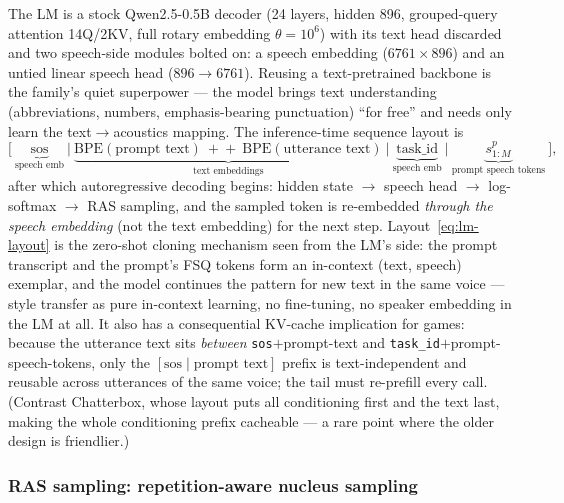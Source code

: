 \documentclass[11pt,a4paper]{article}
\newcommand{\code}[1]{\texttt{#1}}
\begin{document}
The LM is a stock Qwen2.5-0.5B decoder (24 layers, hidden 896, grouped-query attention
14Q/2KV, full rotary embedding $\theta = 10^6$) with its text head discarded and two
speech-side modules bolted on: a speech embedding ($6761 \times 896$) and an untied
linear speech head ($896 \to 6761$). Reusing a text-pretrained backbone is the family's
quiet superpower --- the model brings text understanding (abbreviations, numbers,
emphasis-bearing punctuation) ``for free'' and needs only learn the text$\to$acoustics
mapping. The inference-time sequence layout is
\begin{equation}
\big[\ \underbrace{\mathrm{sos}}_{\text{speech emb}} \ \big|\
\underbrace{\mathrm{BPE}(\text{prompt text}) \ +\!\!+\ \mathrm{BPE}(\text{utterance
text})}_{\text{text embeddings}} \ \big|\
\underbrace{\mathrm{task\_id}}_{\text{speech emb}} \ \big|\
\underbrace{s^{p}_{1:M}}_{\text{prompt speech tokens}} \ \big],
\label{eq:lm-layout}
\end{equation}
after which autoregressive decoding begins: hidden state $\to$ speech head $\to$
log-softmax $\to$ RAS sampling, and the sampled token is re-embedded \emph{through the
speech embedding} (not the text embedding) for the next step. Layout~\eqref{eq:lm-layout}
is the zero-shot cloning mechanism seen from the LM's side: the prompt transcript and
the prompt's FSQ tokens form an in-context (text, speech) exemplar, and the model
continues the pattern for new text in the same voice --- style transfer as pure
in-context learning, no fine-tuning, no speaker embedding in the LM at all. It also has
a consequential KV-cache implication for games: because the utterance text sits
\emph{between} \code{sos}$+$prompt-text and \code{task\_id}$+$prompt-speech-tokens, only
the $[\mathrm{sos} \mid \text{prompt text}]$ prefix is text-independent and reusable
across utterances of the same voice; the tail must re-prefill every call. (Contrast
Chatterbox, whose layout puts all conditioning first and the text last, making the whole
conditioning prefix cacheable --- a rare point where the older design is
friendlier.)

\subsubsection{RAS sampling: repetition-aware nucleus sampling}
\label{sec:ras}
\end{document}
